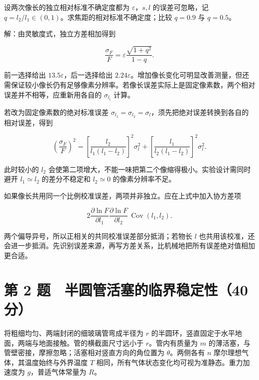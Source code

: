 \documentclass[12pt,a4paper,fontset=fandol]{ctexart}
\begin{document}
设两次像长的独立相对标准不确定度都为 \(\varepsilon\)，\(s,l\)
的误差可忽略，记 \(q=l_2/l_1\in(0,1)\)。求焦距的相对标准不确定度；比较
\(q=0.9\) 与 \(q=0.5\)。

解：由灵敏度式，独立方差相加得到

\[\frac{\sigma_F}{F}=\varepsilon\frac{\sqrt{1+q^2}}{1-q}.\]

前一选择给出 \(13.5\varepsilon\)，后一选择给出
\(2.24\varepsilon\)。增加像长变化可明显改善测量，但还需保证较小像长仍有足够像素分辨率。若像长误差实际上是固定像素数，两个相对误差并不相等，应重新用各自的
\(\sigma_{l_i}\) 计算。

\noindent\begin{minipage}{\linewidth}
若改为固定像素数的绝对标准误差
\(\sigma_{l_1}=\sigma_{l_2}=\sigma_l\)，须先把绝对误差转换到各自的相对误差，得到

\[\left(\frac{\sigma_F}{F}\right)^2
=\left[\frac{l_2}{l_1(l_1-l_2)}\right]^2\sigma_l^2
+\left[\frac{l_1}{l_2(l_1-l_2)}\right]^2\sigma_l^2.\]

此时较小的 \(l_2\)
会使第二项增大，不能一味把第二个像缩得极小。实验设计需同时避开
\(l_1\simeq l_2\) 的差分不稳定和 \(l_2\simeq0\) 的像素分辨率不足。

如果像长共用同一个比例校准误差，两项并非独立。应在上式中加入协方差项

\[2\frac{\partial\ln F}{\partial l_1}
\frac{\partial\ln F}{\partial l_2}\,
\operatorname{Cov}(l_1,l_2).\]

两个偏导异号，所以正相关的共同校准误差部分抵消；若物长 \(l\)
也共用该校准，还会进一步抵消。先识别误差来源，再写方差关系，比机械地把所有误差绝对值相加更合适。


\end{minipage}

\clearpage

\section{第 2
题　半圆管活塞的临界稳定性（40分）}\label{ux7b2c-2-ux9898-ux534aux5706ux7ba1ux6d3bux585eux7684ux4e34ux754cux7a33ux5b9aux602740ux5206}

将粗细均匀、两端封闭的细玻璃管弯成半径为 \(r\)
的半圆环，竖直固定于水平地面，两端与地面接触。管的横截面尺寸远小于
\(r\)。管内有质量为 \(m\)
的薄活塞，与管壁密接，摩擦忽略；活塞相对竖直方向的角位置为
\(\theta\)。两侧各有 \(n\) 摩尔理想气体，其温度始终与外界温度 \(T\)
相同，所有气体状态变化均可视为准静态。重力加速度为 \(g\)，普适气体常量为
\(R\)。
\end{document}
